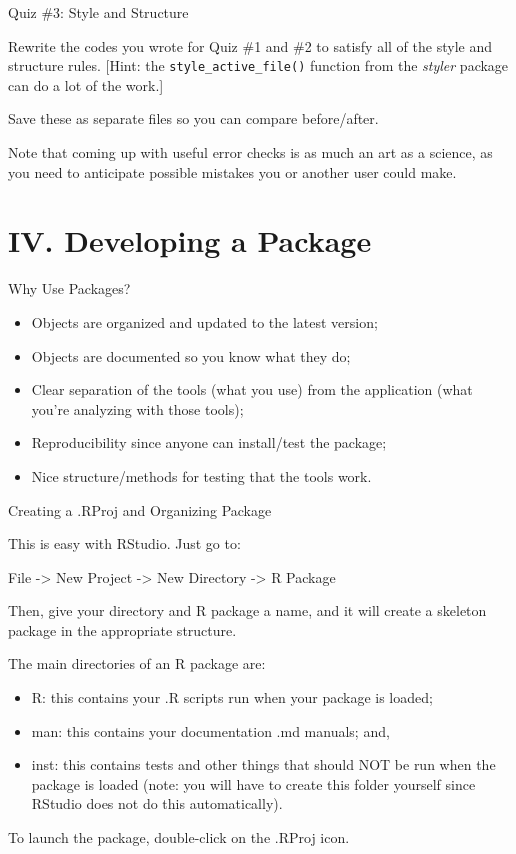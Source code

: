 \documentclass[10pt,ignorenonframetext,]{beamer}
\providecommand{\tightlist}{%
\setlength{\itemsep}{0pt}\setlength{\parskip}{0pt}}
\begin{document}
\begin{frame}[fragile]{Quiz \#3: Style and Structure}

Rewrite the codes you wrote for Quiz \#1 and \#2 to satisfy all of the
style and structure rules. {[}Hint: the \texttt{style\_active\_file()}
function from the \emph{styler} package can do a lot of the work.{]}

Save these as separate files so you can compare before/after.

Note that coming up with useful error checks is as much an art as a
science, as you need to anticipate possible mistakes you or another user
could make.

\end{frame}

\section{IV. Developing a Package}\label{iv.-developing-a-package}

\begin{frame}{Why Use Packages?}

\begin{itemize}
\item
  Objects are organized and updated to the latest version;
\item
  Objects are documented so you know what they do;
\item
  Clear separation of the tools (what you use) from the application
  (what you're analyzing with those tools);
\item
  Reproducibility since anyone can install/test the package;
\item
  Nice structure/methods for testing that the tools work.
\end{itemize}

\end{frame}

\begin{frame}{Creating a .RProj and Organizing Package}

This is easy with RStudio. Just go to:

File -\textgreater{} New Project -\textgreater{} New Directory
-\textgreater{} R Package

Then, give your directory and R package a name, and it will create a
skeleton package in the appropriate structure.

The main directories of an R package are:

\begin{itemize}
\tightlist
\item
  R: this contains your .R scripts run when your package is loaded;
\item
  man: this contains your documentation .md manuals; and,
\item
  inst: this contains tests and other things that should NOT be run when
  the package is loaded (note: you will have to create this folder
  yourself since RStudio does not do this automatically).
\end{itemize}

To launch the package, double-click on the .RProj icon.

\end{frame}
\end{document}
